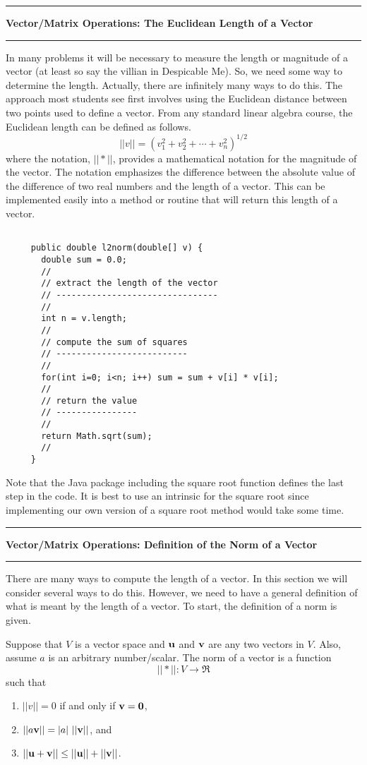 \documentclass[10pt,fleqn]{article}
\begin{document}
\vskip0.1in\hrule\vskip0.1in
\noindent
{\bf Vector/Matrix Operations: The Euclidean Length of a Vector}
\vskip0.1in\hrule\vskip0.1in
\noindent
In many problems it will be necessary to measure the length or magnitude of a
vector (at least so say the villian in Despicable Me). So, we need some way to
determine the length. Actually, there are infinitely many ways to do this. The
approach most students see first involves using the Euclidean distance between
two points used to define a vector. From any standard linear algebra course, the
Euclidean length can be defined as follows.
$$
  || v || = ( v_1^2 + v_2^2 + \cdots + v_n^2 )^{1/2}
$$
where the notation, $||*||$, provides a mathematical notation for the magnitude
of the vector. The notation emphasizes the difference between the absolute 
value of the difference of two real numbers and the length of a vector. This can
be implemented easily into a method or routine that will return this length of a
vector.
\begin{verbatim}

     public double l2norm(double[] v) {
       double sum = 0.0;
       //
       // extract the length of the vector
       // --------------------------------
       //
       int n = v.length;
       //
       // compute the sum of squares
       // --------------------------
       //
       for(int i=0; i<n; i++) sum = sum + v[i] * v[i];
       //
       // return the value
       // ----------------
       //
       return Math.sqrt(sum);
       //
     }

\end{verbatim}
Note that the Java package including the square root function defines the last
step in the code. It is best to use an intrinsic for the square root since
implementing our own version of a square root method would take some time.
\newpage
\vskip0.1in\hrule\vskip0.1in
\noindent
{\bf Vector/Matrix Operations: Definition of the Norm of a Vector}
\vskip0.1in\hrule\vskip0.1in
\noindent
There are many ways to compute the length of a vector. In this section we will
consider several ways to do this. However, we need to have a general definition
of what is meant by the length of a vector. To start, the definition of a norm
is given.
\begin{definition}
   Suppose that $V$ is a vector space and ${\bf u}$ and ${\bf v}$ are any two
   vectors in $V$. Also, assume $a$ is an arbitrary number/scalar. The norm of a
   vector is a function
   $$
     || * || : V \rightarrow \Re
   $$
   such that
   \begin{enumerate}
     \item $||v||=0$ if and only if ${\bf v} = {\bf 0}$,
     \item $||a{\bf v}|| = |a|\ ||{\bf v}||$, and
     \item $||{\bf u} + {\bf v} || \leq ||{\bf u}|| + ||{\bf v}||$.
   \end{enumerate}
\end{definition}
\end{document}
